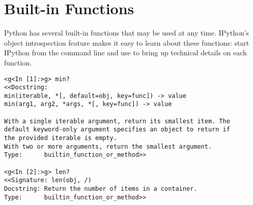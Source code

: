 \label{lab:Standard Library}

\section*{Built-in Functions} %

Python has several built-in functions that may be used at any time.
IPython's object introspection feature makes it easy to learn about these functions: start IPython from the command line and use  to bring up technical details on each function.

\begin{lstlisting}
<g<In [1]:>g> min?
<<Docstring:
min(iterable, *[, default=obj, key=func]) -> value
min(arg1, arg2, *args, *[, key=func]) -> value

With a single iterable argument, return its smallest item. The
default keyword-only argument specifies an object to return if
the provided iterable is empty.
With two or more arguments, return the smallest argument.
Type:      builtin_function_or_method>>

<g<In [2]:>g> len?
<<Signature: len(obj, /)
Docstring: Return the number of items in a container.
Type:      builtin_function_or_method>>
\end{lstlisting}

